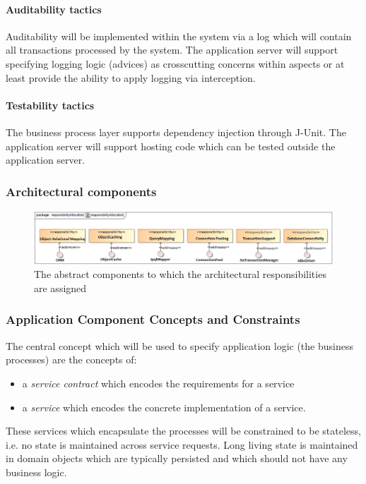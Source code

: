 \documentclass[a4paper,12pt]{report}
\begin{document}
\paragraph {Auditability tactics}
\hfill \break
Auditability will be implemented within the system via a log which will contain all transactions processed by the system. The application server will support specifying logging logic (advices) as crosscutting concerns within aspects or at least provide the ability to apply logging via interception.

\paragraph {Testability tactics }
\hfill \break
The business process layer supports dependency injection through J-Unit. The application server will support hosting code which can be tested outside the application server.

\subsubsection {Architectural components}
	\begin{figure}[htb]
		\centering
		\includegraphics [scale=0.5]{../Diagrams/PersistanceResponsibiltiesAllocationZ.png}
		\caption{The abstract components to which the architectural responsibilities are assigned}
	\end{figure}

\subsubsection {Application Component Concepts and Constraints}
The central concept which will be used to specify application logic (the business processes) are the
concepts of:
	\begin {itemize}
		\item a \textit{service contract} which encodes the requirements for a service
		\item a \textit{service} which encodes the concrete implementation of a service. 
	\end {itemize}
These services which encapsulate the processes will be constrained to be stateless, i.e. no state
is maintained across service requests.
Long living state is maintained in domain objects which are typically persisted and which should
not have any business logic.
\end{document}
